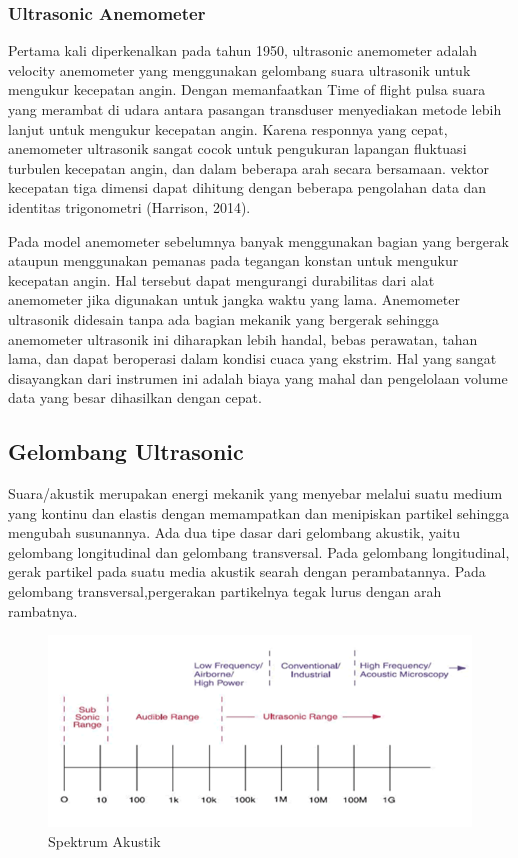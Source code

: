 \subsubsection{Ultrasonic Anemometer}

Pertama kali diperkenalkan pada tahun 1950, ultrasonic anemometer adalah velocity anemometer yang menggunakan gelombang suara ultrasonik 
untuk mengukur kecepatan angin. Dengan memanfaatkan Time of flight pulsa suara yang merambat di udara antara pasangan transduser menyediakan metode lebih lanjut untuk mengukur kecepatan angin. 
Karena responnya yang cepat, anemometer ultrasonik sangat 
cocok untuk pengukuran lapangan fluktuasi turbulen kecepatan angin, dan dalam beberapa arah secara bersamaan. vektor kecepatan tiga dimensi dapat 
dihitung dengan beberapa pengolahan data dan identitas trigonometri (Harrison, 2014).

Pada model anemometer sebelumnya banyak menggunakan bagian yang bergerak ataupun menggunakan pemanas pada tegangan konstan untuk mengukur kecepatan angin. Hal tersebut dapat mengurangi durabilitas
dari alat anemometer jika digunakan untuk jangka waktu yang lama.
Anemometer ultrasonik didesain tanpa ada bagian mekanik yang bergerak sehingga anemometer ultrasonik ini 
diharapkan lebih handal, bebas perawatan, tahan lama, dan dapat beroperasi dalam kondisi cuaca yang ekstrim. 
Hal yang sangat disayangkan dari instrumen ini adalah biaya yang mahal dan pengelolaan volume data yang besar dihasilkan dengan cepat. 

\subsection{Gelombang Ultrasonic}
Suara/akustik merupakan energi mekanik yang menyebar melalui suatu medium yang kontinu dan elastis dengan memampatkan dan menipiskan partikel 
sehingga mengubah susunannya. Ada dua tipe dasar dari gelombang akustik, yaitu gelombang longitudinal dan gelombang transversal. Pada gelombang 
longitudinal, gerak partikel pada suatu media akustik searah dengan perambatannya. Pada gelombang transversal,pergerakan partikelnya tegak lurus dengan arah rambatnya.

\begin{figure}[h!]
	\centering
	\includegraphics[width=0.8\linewidth]{"gambar/spektrum akustik"}
	\caption{Spektrum Akustik \parencite{figGelombangAkustik}}
	\label{fig:spektrum-akustik}
\end{figure}

